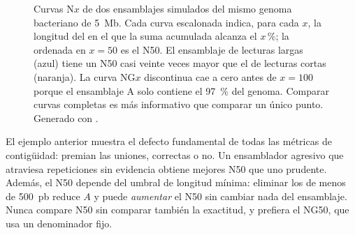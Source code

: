 \begin{figure}[t]
\centering
{}
\caption[Curvas N$x$ de dos ensamblajes]{Curvas N$x$ de dos ensamblajes simulados del mismo genoma bacteriano de \SI{5}{Mb}. Cada curva escalonada indica, para cada $x$, la longitud del  en el que la suma acumulada alcanza el $x\,\%$; la ordenada en $x=50$ es el N50. El ensamblaje de lecturas largas (azul) tiene un N50 casi veinte veces mayor que el de lecturas cortas (naranja). La curva NG$x$ discontinua cae a cero antes de $x=100$ porque el ensamblaje A solo contiene el \SI{97}{\percent} del genoma. Comparar curvas completas es más informativo que comparar un único punto. Generado con .}
\label{fig:08-nx}
\end{figure}

\begin{cuidado}
El ejemplo anterior muestra el defecto fundamental de todas las métricas de contigüidad: premian las uniones, correctas o no. Un ensamblador agresivo que atraviesa repeticiones sin evidencia obtiene mejores N50 que uno prudente. Además, el N50 depende del umbral de longitud mínima: eliminar los  de menos de \SI{500}{pb} reduce $A$ y puede \emph{aumentar} el N50 sin cambiar nada del ensamblaje. Nunca compare N50 sin comparar también la exactitud, y prefiera el NG50, que usa un denominador fijo.
\end{cuidado}

